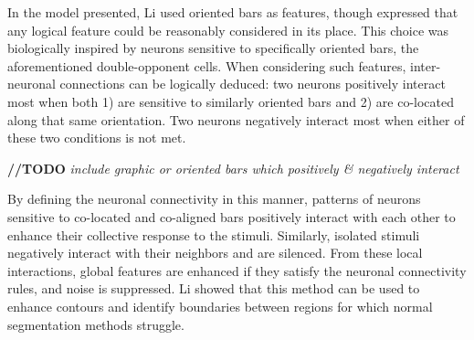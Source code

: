 \documentclass[journal,onecolumn]{IEEEtran}
\begin{document}
In the model presented, Li used oriented bars as features, though expressed that any logical feature could be reasonably considered in its place. This choice was biologically inspired by neurons sensitive to specifically oriented bars, the aforementioned double-opponent cells. When considering such features, inter-neuronal connections can be logically deduced: two neurons positively interact most when both 1) are sensitive to similarly oriented bars and 2) are co-located along that same orientation. Two neurons negatively interact most when either of these two conditions is not met.

\textbf{//TODO} \textit{include graphic or oriented bars which positively \& negatively interact}

By defining the neuronal connectivity in this manner, patterns of neurons sensitive to co-located and co-aligned bars positively interact with each other to enhance their collective response to the stimuli. Similarly, isolated stimuli negatively interact with their neighbors and are silenced. From these local interactions, global features are enhanced if they satisfy the neuronal connectivity rules, and noise is suppressed. Li showed that this method can be used to enhance contours and identify boundaries between regions for which normal segmentation methods struggle.
\end{document}
